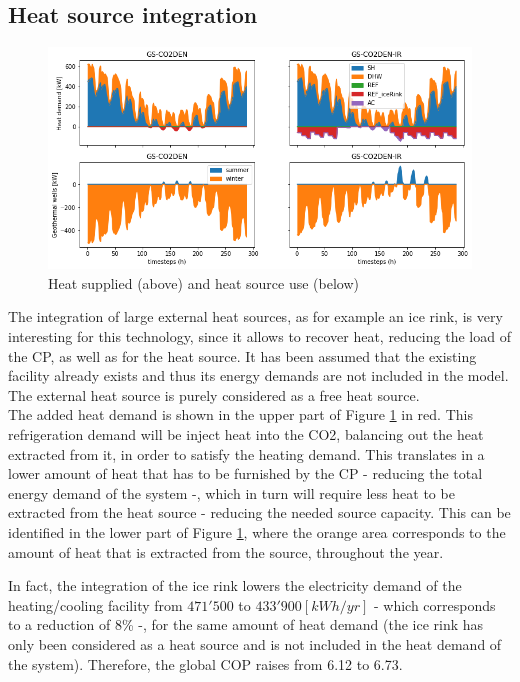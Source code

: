 \documentclass{article}
\begin{document}
\subsection{Heat source integration}

\begin{figure}[thpb]
	\centering
	\includegraphics[width=1\linewidth]{Images/V_IR_Q}
	\caption{Heat supplied (above) and heat source use (below)}
	\label{fig:V_IR_Q}
\end{figure}

The integration of large external heat sources, as for example an ice rink, is very interesting for this technology, since it allows to recover heat, reducing the load of the CP, as well as for the heat source. It has been assumed that the existing facility already exists and thus its energy demands are not included in the model. The external heat source is purely considered as a free heat source.\\

The added heat demand is shown in the upper part of Figure \ref{fig:V_IR_Q} in red. This refrigeration demand will be inject heat into the CO2, balancing out the heat extracted from it, in order to satisfy the heating demand. This translates in a lower amount of heat that has to be furnished by the CP - reducing the total energy demand of the system -, which in turn will require less heat to be extracted from the heat source - reducing the needed source capacity. This can be identified in the lower part of Figure \ref{fig:V_IR_Q}, where the orange area corresponds to the amount of heat that is extracted from the source, throughout the year.

In fact, the integration of the ice rink lowers the electricity demand of the heating/cooling facility from $471'500$ to $433'900 [kWh/yr]$ - which corresponds to a reduction of 8\% -, for the same amount of heat demand (the ice rink has only been considered as a heat source and is not included in the heat demand of the system). Therefore, the global COP raises from 6.12 to 6.73.
\end{document}
